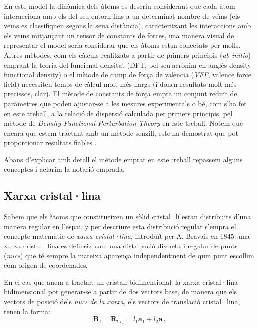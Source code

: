 \documentclass[12pt]{article} %
\let\vec\mathbf %
\begin{document}
En este model la dinàmica dels àtoms es descriu considerant que cada àtom interacciona amb els del seu entorn fins a un determinat nombre de veïns (els veïns es classifiquen segons la seua distància), caracteritzant les interaccions amb els veïns mitjançant un tensor de constants de forces, una manera visual de representar el model seria considerar que els àtoms estan conectats per molls. Altres mètodes, com els càlculs realitzats a partir de primers principis (\emph{ab initio}) emprant la teoria del funcional densitat (DFT, pel seu acrònim en anglés \foreignlanguage{english}{density-functional density}) o el mètode de camp de força de valència (\emph{VFF}, \foreignlanguage{english}{valence force field}) necessiten temps de càlcul molt més llargs (i donen resultats molt més precissos, clar). El mètode de constants de força empra un conjunt reduït de paràmetres que poden ajustar-se a les mesures experimentals o bé, com s'ha fet en este treball, a la relació de dispersió calculada per primers principis, pel mètode de \emph{Density Functional Perturbation Theory} en este treball.  Notem que encara que estem tractant amb un mètode senzill, este ha demostrat que pot proporcionar resultats fiables \cite{wirtz04_phonon_disper_graph_revis}.

Abans d'explicar amb detall el mètode emprat en este treball repassem alguns conceptes i aclarim la notació emprada.

\subsection{Xarxa cristal·lina}

Sabem que els àtoms que constitueixen un sòlid cristal·lí estan distribuïts d'una manera regular en l'espai, y per descriure esta distribució regular s'empra el concepte matemàtic de \emph{xarxa cristal·lina}, introduït per A. Bravais en 1845: una xarxa cristal·lina es defineix com una distribució discreta i regular de punts (\emph{nucs}) que té sempre la mateixa aparença independentment de quin punt escollim com origen de coordenades.

En el cas que anem a tractar, un cristall bidimensional, la xarxa cristal·lina bidimensional pot generar-se a partir de dos vectors base, de manera que els vectors de posició dels \emph{nucs de la xarxa}, els vectors de translació cristal·lina,  tenen la forma:
\begin{equation}
 \vec R_\vec l=\vec R_{l_1 l_2}=l_1 \vec a_1 +l_2\vec a_2
\end{equation}
\end{document}

